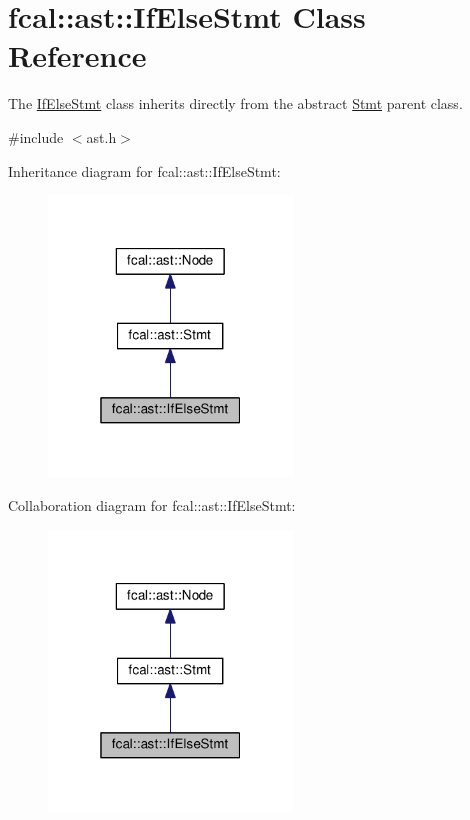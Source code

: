 \hypertarget{classfcal_1_1ast_1_1IfElseStmt}{}\section{fcal\+:\+:ast\+:\+:If\+Else\+Stmt Class Reference}
\label{classfcal_1_1ast_1_1IfElseStmt}


The \hyperlink{classfcal_1_1ast_1_1IfElseStmt}{If\+Else\+Stmt} class inherits directly from the abstract \hyperlink{classfcal_1_1ast_1_1Stmt}{Stmt} parent class.  




{\ttfamily \#include $<$ast.\+h$>$}



Inheritance diagram for fcal\+:\+:ast\+:\+:If\+Else\+Stmt\+:
\nopagebreak
\begin{figure}[H]
\begin{center}
\leavevmode
\includegraphics[width=184pt]{classfcal_1_1ast_1_1IfElseStmt__inherit__graph}
\end{center}
\end{figure}


Collaboration diagram for fcal\+:\+:ast\+:\+:If\+Else\+Stmt\+:
\nopagebreak
\begin{figure}[H]
\begin{center}
\leavevmode
\includegraphics[width=184pt]{classfcal_1_1ast_1_1IfElseStmt__coll__graph}
\end{center}
\end{figure}
